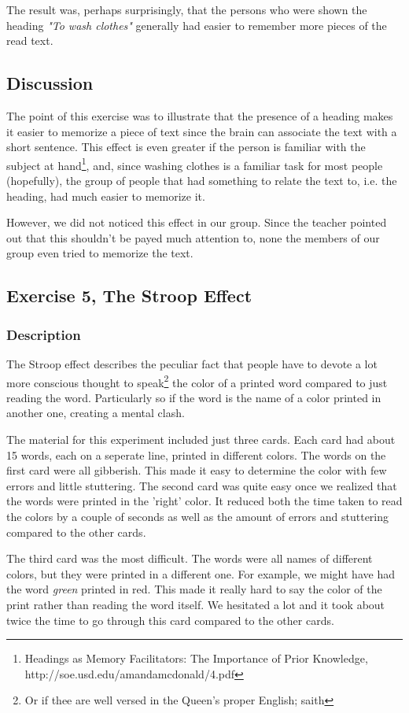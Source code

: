 \documentclass[10pt, a4paper]{article}
\begin{document}
The result was, perhaps surprisingly, that the persons who were shown the heading \emph{"To wash clothes"} generally had easier to remember more pieces of the read text.

\subsection{Discussion}
The point of this exercise was to illustrate that the presence of a heading makes it easier to memorize a piece of text since the brain can associate the text with a short sentence. This effect is even greater if the person is familiar with the subject at hand\footnote{Headings as Memory Facilitators: The Importance of Prior Knowledge, http://soe.usd.edu/amandamcdonald/4.pdf}, and, since washing clothes is a familiar task for most people (hopefully), the group of people that had something to relate the text to, i.e. the heading, had much easier to memorize it.

However, we did not noticed this effect in our group. Since the teacher pointed out that this shouldn't be payed much attention to, none the members of our group even tried to memorize the text.

\subsection{Exercise 5, The Stroop Effect}
\subsubsection{Description}
The Stroop effect describes the peculiar fact that people have to devote a lot more conscious thought to speak\footnote{Or if thee are well versed in the Queen's proper English; saith} the color of a printed word compared to just reading the word. Particularly so if the word is the name of a color printed in another one, creating a mental clash.

The material for this experiment included just three cards.  Each card had about 15 words, each on a seperate line, printed in different colors.  The words on the first card were all gibberish. This made it easy to determine the color with few errors and little stuttering. 
The second card was quite easy once we realized that the words were printed in the 'right' color. It reduced both the time taken to read the colors by a couple of seconds as well as the amount of errors and stuttering compared to the other cards.

The third card was the most difficult. The words were all names of different colors, but they were printed in a different one. For example, we might have had the word \emph{green} printed in red. This made it really hard to say the color of the print rather than reading the word itself.  We hesitated a lot and it took about twice the time to go through this card compared to the other cards. 
\end{document}
